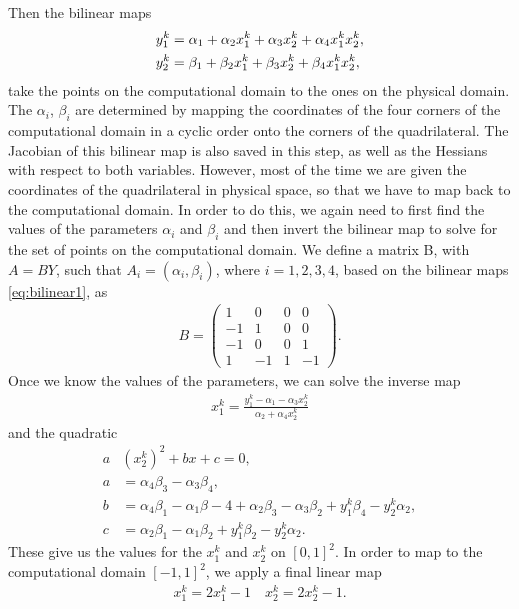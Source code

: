 \documentclass[11pt, a4paper]{article}
\theoremstyle{definition}
\begin{document}
Then the bilinear maps
\begin{align}\label{eq:bilinear1}
	y_1^k &= \alpha_1 + \alpha_2 x_1^k + \alpha_3 x_2^k + \alpha_4 x_1^k x_2^k,\\
	y_2^k &= \beta_1 + \beta_2 x_1^k + \beta_3 x_2^k + \beta_4 x_1^k x_2^k, \notag
\end{align}
take the points on the computational domain to the ones on the physical domain. The $\alpha_i$, $\beta_i$ are determined by mapping the coordinates of the four corners of the computational domain in a cyclic order onto the corners of the quadrilateral. 
The Jacobian of this bilinear map is also saved in this step, as well as the Hessians with respect to both variables.
However, most of the time we are given the coordinates of the quadrilateral in physical space, so that we have to map back to the computational domain. In order to do this, we again need to first find the values of the parameters $\alpha_i$ and $\beta_i$ and then invert the bilinear map to solve for the set of points on the computational domain.
We define a matrix B, with $A = BY$, such that $A_i = (\alpha_i, \beta_i)$, where $i = 1,2,3,4$, based on the bilinear maps \eqref{eq:bilinear1}, as
\begin{align*}
	B  =
	\begin{pmatrix}
		1 & 0 & 0 & 0 \\
		- 1 & 1 & 0 & 0 \\
		-1 & 0 & 0 & 1 \\
		1 & -1 & 1 & -1
	\end{pmatrix}	.
\end{align*}
Once we know the values of the parameters, we can solve the inverse map
\begin{align*}
	x_1^k = \frac{y_1^k - \alpha_1 -\alpha_3 x_2^k}{\alpha_2 + \alpha_4 x_2^k}
\end{align*}
and the quadratic
\begin{align*}
	a&\left(x_2^k\right)^2 + bx + c = 0,\\
	a &= \alpha_4 \beta_3 - \alpha_3 \beta_4,\\
	b &= \alpha_4 \beta_1 - \alpha_1 \beta-4 + \alpha_2 \beta_3 -\alpha_3 \beta_2 + y_1^k \beta_4 - y_2^k \alpha_2,\\
	c &= \alpha_2 \beta_1 - \alpha_1 \beta_2 + y_1^k \beta_2 - y_2^k \alpha_2.
\end{align*}
These give us the values for the $x_1^k$ and $x_2^k$ on $[0,1]^2$. In order to map to the computational domain $[-1,1]^2$, we apply a final linear map
\begin{align*}
	x_1^k = 2x_1^k - 1 \quad	x_2^k = 2x_2^k - 1.
\end{align*}
\end{document}
